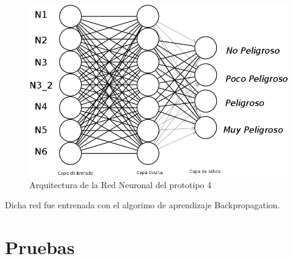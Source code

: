 \begin{figure}
\begin{center}
\includegraphics[scale=.3]{images/redneuronal}
\caption{Arquitectura de la Red Neuronal del prototipo 4}
\label{fig:redNeuronal}
\end{center}
\end{figure}

Dicha red fue entrenada con el algorimo de aprendizaje Backpropagation.

\section{Pruebas} 


